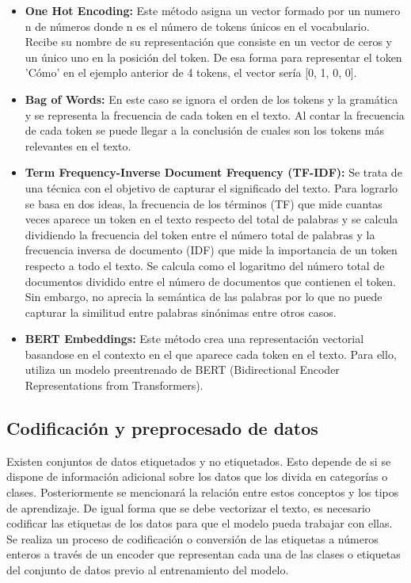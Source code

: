 \begin{itemize}
	\item \textbf{One Hot Encoding:} Este método asigna un vector formado por un numero n de números donde n es el número de tokens únicos en el vocabulario.
	Recibe su nombre de su representación que consiste en un vector de ceros y un único uno en la posición del token. De esa forma para representar el token 'Cómo' en el ejemplo anterior de 4 tokens, el vector sería [0, 1, 0, 0].
	\item \textbf{Bag of Words:} En este caso se ignora el orden de los tokens y la gramática y se representa la frecuencia de cada token en el texto.
	Al contar la frecuencia de cada token se puede llegar a la conclusión de cuales son los tokens más relevantes en el texto.
	\item \textbf{Term Frequency-Inverse Document Frequency (TF-IDF):} Se trata de una técnica con el objetivo de capturar el significado del texto. 
	Para lograrlo se basa en dos ideas, la frecuencia de los términos (TF) que mide cuantas veces aparece un token en el texto respecto del total de palabras y se calcula dividiendo la frecuencia del token entre el número total de palabras y la frecuencia inversa de documento (IDF) que mide la importancia de un token respecto a todo el texto.
	Se calcula como el logaritmo del número total de documentos dividido entre el número de documentos que contienen el token.
	Sin embargo, no aprecia la semántica de las palabras por lo que no puede capturar la similitud entre palabras sinónimas entre otros casos.
	\item \textbf{BERT Embeddings:} Este método crea una representación vectorial basandose en el contexto en el que aparece cada token en el texto. Para ello, utiliza un modelo preentrenado de BERT (Bidirectional Encoder Representations from Transformers).
\end{itemize}

\subsection{Codificación y preprocesado de datos}

Existen conjuntos de datos etiquetados y no etiquetados. Esto depende de si se dispone de información adicional sobre los datos que los divida en categorías o clases.
Posteriormente se mencionará la relación entre estos conceptos y los tipos de aprendizaje.
De igual forma que se debe vectorizar el texto, es necesario codificar las etiquetas de los datos para que el modelo pueda trabajar con ellas.
Se realiza un proceso de codificación o conversión de las etiquetas a números enteros a través de un encoder que representan cada una de las clases o etiquetas del conjunto de datos previo al entrenamiento del modelo.

